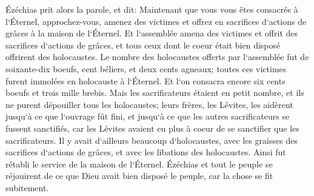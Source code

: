 \verse Ézéchias prit alors la parole, et dit: Maintenant que vous vous êtes consacrés à l`Éternel, approchez-vous, amenez des victimes et offrez en sacrifices d`actions de grâces à la maison de l`Éternel. Et l`assemblée amena des victimes et offrit des sacrifices d`actions de grâces, et tous ceux dont le coeur était bien disposé offrirent des holocaustes. 
\verse Le nombre des holocaustes offerts par l`assemblée fut de soixante-dix boeufs, cent béliers, et deux cents agneaux; toutes ces victimes furent immolées en holocauste à l`Éternel. 
\verse Et l`on consacra encore six cents boeufs et trois mille brebis. 
\verse Mais les sacrificateurs étaient en petit nombre, et ils ne purent dépouiller tous les holocaustes; leurs frères, les Lévites, les aidèrent jusqu`à ce que l`ouvrage fût fini, et jusqu`à ce que les autres sacrificateurs se fussent sanctifiés, car les Lévites avaient eu plus à coeur de se sanctifier que les sacrificateurs. 
\verse Il y avait d`ailleurs beaucoup d`holocaustes, avec les graisses des sacrifices d`actions de grâces, et avec les libations des holocaustes. Ainsi fut rétabli le service de la maison de l`Éternel. 
\verse Ézéchias et tout le peuple se réjouirent de ce que Dieu avait bien disposé le peuple, car la chose se fit subitement. 

